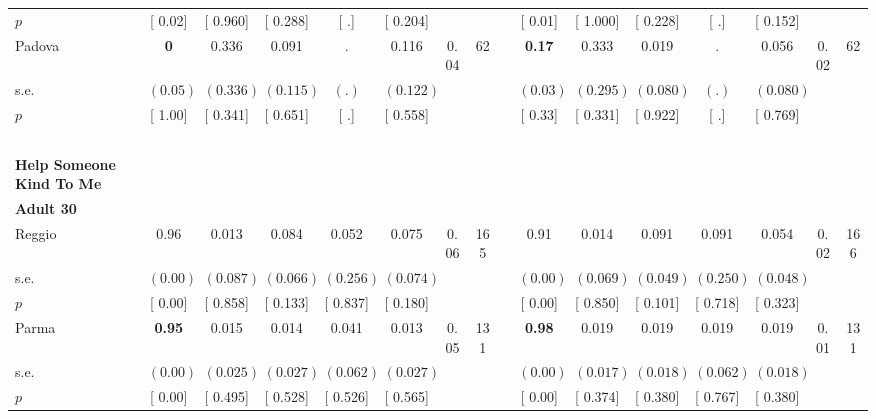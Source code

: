 \begin{longtable}{L{8em} c c c c c c c p{1em} c c c c c c c}
\quad \quad \quad \quad $ p$ & [     0.02] & [    0.960] & [    0.288] & [        .] & [    0.204] & & & & [     0.01] & [    1.000] & [    0.228] & [        .] & [    0.152] & &  \\[1em]
\quad \quad \quad Padova& \textbf{0} &     0.336 &     0.091 &         . &     0.116 &      0.04 &        62 & & \textbf{     0.17} &     0.333 &     0.019 &         . &     0.056 &      0.02 &        62  \\*
\quad \quad \quad \quad s.e.& $ (     0.05)$ & $ (    0.336)$ & $ (    0.115)$ & $ (        .)$ & $ (    0.122)$ & & & & $ (     0.03)$ & $ (    0.295)$ & $ (    0.080)$ & $ (        .)$ & $ (    0.080)$ & &  \\*
\quad \quad \quad \quad $ p$ & [     1.00] & [    0.341] & [    0.651] & [        .] & [    0.558] & & & & [     0.33] & [    0.331] & [    0.922] & [        .] & [    0.769] & &  \\[1em]
~\\[1em]
\textbf{Help Someone Kind To Me} \\*
\quad \quad \textbf{Adult 30} & & & & & & & & & & & & & & & \\* 
\quad \quad \quad Reggio& 0.96 &     0.013 &     0.084 &     0.052 &     0.075 &      0.06 &       165 & & 0.91 &     0.014 &     0.091 &     0.091 &     0.054 &      0.02 &       166  \\*
\quad \quad \quad \quad s.e.& $ (     0.00)$ & $ (    0.087)$ & $ (    0.066)$ & $ (    0.256)$ & $ (    0.074)$ & & & & $ (     0.00)$ & $ (    0.069)$ & $ (    0.049)$ & $ (    0.250)$ & $ (    0.048)$ & &  \\*
\quad \quad \quad \quad $ p$ & [     0.00] & [    0.858] & [    0.133] & [    0.837] & [    0.180] & & & & [     0.00] & [    0.850] & [    0.101] & [    0.718] & [    0.323] & &  \\[1em]
\quad \quad \quad Parma& \textbf{     0.95} &     0.015 &     0.014 &     0.041 &     0.013 &      0.05 &       131 & & \textbf{     0.98} &     0.019 &     0.019 &     0.019 &     0.019 &      0.01 &       131  \\*
\quad \quad \quad \quad s.e.& $ (     0.00)$ & $ (    0.025)$ & $ (    0.027)$ & $ (    0.062)$ & $ (    0.027)$ & & & & $ (     0.00)$ & $ (    0.017)$ & $ (    0.018)$ & $ (    0.062)$ & $ (    0.018)$ & &  \\*
\quad \quad \quad \quad $ p$ & [     0.00] & [    0.495] & [    0.528] & [    0.526] & [    0.565] & & & & [     0.00] & [    0.374] & [    0.380] & [    0.767] & [    0.380] & &  \\[1em]

\end{longtable}
